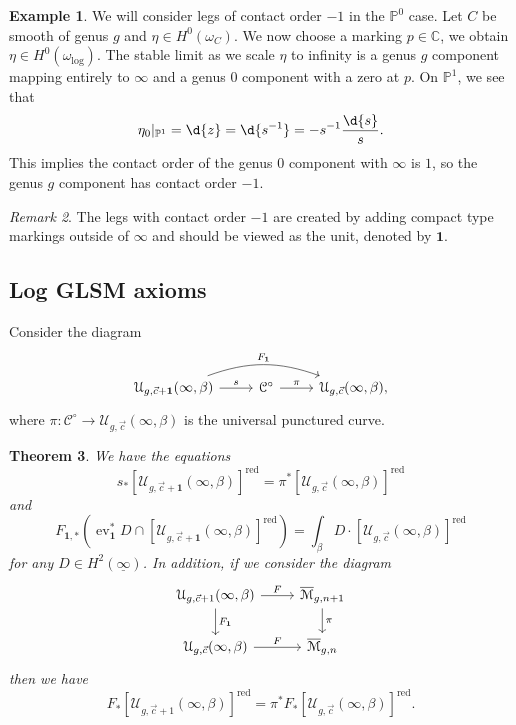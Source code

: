 \documentclass[10pt,oldfontcommands,oneside]{memoir}
\newtheorem{thm}{Theorem}[section]
\theoremstyle{definition}
\newtheorem{exm}[thm]{Example}
\theoremstyle{remark}
\newtheorem{rmk}[thm]{Remark}
\theoremstyle{plain}
\theoremstyle{definition}
\theoremstyle{remark}
\newcommand{\C}{\mathbb{C}}
\renewcommand{\P}{\mathbb{P}}
\newcommand{\Mbar}{\overline{\mathcal{M}}}
\newcommand{\mc}[1]{\mathcal{#1}}
\newcommand{\on}[1]{\operatorname{#1}}
\newcommand{\ul}[1]{\underline{#1}}
\newcommand{\1}{\mathbf{1}}
\newcommand{\2}{\mathbf{2}}
\newcommand{\3}{\mathbf{3}}
\DeclareMathOperator{\ev}{ev}
\begin{document}
\begin{exm}
    We will consider legs of contact order $-1$ in the $\P^0$ case. Let $C$ be smooth of genus $g$ and $\eta \in H^0(\omega_C)$. We now choose a marking $p \in \C$, we obtain $\eta \in H^0(\omega_{\log})$. The stable limit as we scale $\eta$ to infinity is a genus $g$ component mapping entirely to $\infty$ and a genus $0$ component with a zero at $p$. On $\P^1$, we see that
    \[ \eta_0|_{\P^1} = \d{z} = \d{s^{-1}} = -s^{-1} \frac{\d{s}}{s}. \]
    This implies the contact order of the genus $0$ component with $\infty$ is $1$, so the genus $g$ component has contact order $-1$.
\end{exm}

\begin{rmk}
    The legs with contact order $-1$ are created by adding compact type markings outside of $\infty$ and should be viewed as the unit, denoted by $\1$.
\end{rmk}

\subsection{Log GLSM axioms}%
\label{sub:Log GLSM axioms}

Consider the diagram
\begin{equation*}
\begin{tikzcd}
    \mc{U}_{g, \vec{c}+\1}(\infty, \beta) \ar{r}{s} \ar[bend left=20]{rr}{F_{\1}} & \mc{C}^{\circ} \ar{r}{\pi} & \mc{U}_{g, \vec{c}}(\infty, \beta),
\end{tikzcd}
\end{equation*}
where $\pi \colon \mc{C}^{\circ} \to \mc{U}_{g, \vec{c}}(\infty, \beta)$ is the universal punctured curve.

\begin{thm}
    We have the equations
    \[ s_* [\mc{U}_{g, \vec{c}+\1}(\infty, \beta)]^{\on{red}} = \pi^* [\mc{U}_{g, \vec{c}}(\infty, \beta)]^{\on{red}} \]
    and 
    \[ F_{\1, *} (\ev_{\1}^* D \cap [\mc{U}_{g, \vec{c}+\1}(\infty, \beta)]^{\on{red}}) = \int_{\beta} D \cdot [\mc{U}_{g, \vec{c}}(\infty, \beta)]^{\on{red}} \]
    for any $D \in H^2(\ul{\infty})$. In addition, if we consider the diagram
    \begin{equation*}
    \begin{tikzcd}
        \mc{U}_{g, \vec{c}+1}(\infty, \beta) \ar{r}{F} \ar{d}{F_{\1}} & \Mbar_{g,n+1} \ar{d}{\pi} \\
        \mc{U}_{g, \vec{c}}(\infty,\beta) \ar{r}{F} & \Mbar_{g,n}
    \end{tikzcd}
    \end{equation*}
    then we have
    \[ F_* [\mc{U}_{g,\vec{c}+1}(\infty, \beta)]^{\on{red}}= \pi^* F_*[\mc{U}_{g, \vec{c}}(\infty, \beta)]^{\on{red}}. \]
\end{thm}
\end{document}
